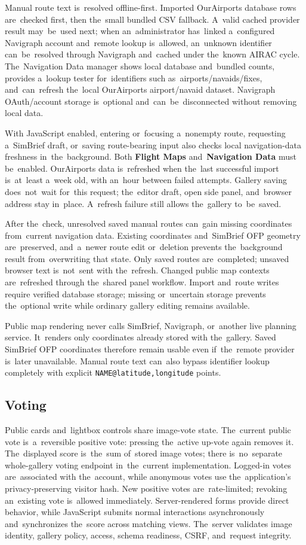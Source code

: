 \documentclass[11pt,a4paper]{article}
\newcommand{\ui}[1]{\textbf{#1}}
\newcommand{\codeword}[1]{\nolinkurl{#1}}
\begin{document}
Manual route text is~resolved offline-first. Imported OurAirports database rows
are~checked first, then the~small bundled CSV fallback. A~valid cached provider
result may~be~used next; when an~administrator has~linked a~configured Navigraph
account and~remote lookup is~allowed, an~unknown identifier can~be~resolved
through Navigraph and~cached under the~known AIRAC cycle. The~Navigation Data
manager shows local database and~bundled counts, provides a~lookup tester
for~identifiers such as~airports/navaids/fixes, and~can~refresh the~local
OurAirports airport/navaid dataset. Navigraph OAuth/account storage is~optional
and~can~be~disconnected without removing local data.

With JavaScript enabled, entering or~focusing a~nonempty route, requesting
a~SimBrief draft, or~saving route-bearing input also checks local
navigation-data freshness in~the~background. Both \ui{Flight Maps}
and~\ui{Navigation Data} must be~enabled. OurAirports data is~refreshed when
the~last successful import is~at~least a~week old, with an~hour between failed
attempts. Gallery saving does~not~wait for~this request; the~editor draft, open
side panel, and~browser address stay in~place. A~refresh failure still allows
the~gallery to~be~saved.

After the~check, unresolved saved manual routes can~gain missing coordinates
from~current navigation data. Existing coordinates and~SimBrief OFP geometry
are~preserved, and~a~newer route edit or~deletion prevents the~background result
from~overwriting that state. Only saved routes are~completed; unsaved browser
text is~not~sent with the~refresh. Changed public map contexts are~refreshed
through the~shared panel workflow. Import and~route writes require verified
database storage; missing or~uncertain storage prevents the~optional write while
ordinary gallery editing remains available.

Public map rendering never calls SimBrief, Navigraph, or~another live planning
service. It~renders only coordinates already stored with the~gallery. Saved
SimBrief OFP coordinates therefore remain usable even if~the~remote provider
is~later unavailable. Manual route text can~also bypass identifier lookup
completely with explicit \codeword{NAME@latitude,longitude} points.

\subsection{Voting}

Public cards and~lightbox controls share image-vote state. The~current public
vote is~a~reversible positive vote: pressing the~active up-vote again removes
it. The~displayed score is~the~sum of~stored image votes; there is~no~separate
whole-gallery voting endpoint in~the~current implementation. Logged-in votes
are~associated with the~account, while anonymous votes use the~application's
privacy-preserving visitor hash. New positive votes are~rate-limited; revoking
an~existing vote is~allowed immediately. Server-rendered forms provide direct
behavior, while JavaScript submits normal interactions asynchronously
and~synchronizes the~score across matching views. The~server validates image
identity, gallery policy, access, schema readiness, CSRF, and~request integrity.
\end{document}
